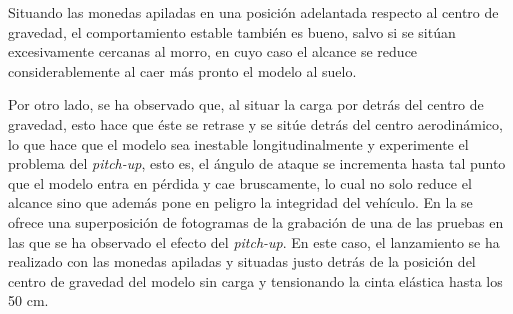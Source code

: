 Situando las monedas apiladas en una posición adelantada respecto al centro de gravedad, el comportamiento estable también es bueno, salvo si se sitúan excesivamente cercanas al morro, en cuyo caso el alcance se reduce considerablemente al caer más pronto el modelo al suelo.

Por otro lado, se ha observado que, al situar la carga por detrás del centro de gravedad, esto hace que éste se retrase y se sitúe detrás del centro aerodinámico, lo que hace que el modelo sea inestable longitudinalmente y experimente el problema del \emph{pitch-up}, esto es, el ángulo de ataque se incrementa hasta tal punto que el modelo entra en pérdida y cae bruscamente, lo cual no solo reduce el alcance sino que además pone en peligro la integridad del vehículo. En la  se ofrece una superposición de fotogramas de la grabación de una de las pruebas en las que se ha observado el efecto del \emph{pitch-up}. En este caso, el lanzamiento se ha realizado con las monedas apiladas y situadas justo detrás de la posición del centro de gravedad del modelo sin carga y tensionando la cinta elástica hasta los 50 cm.

